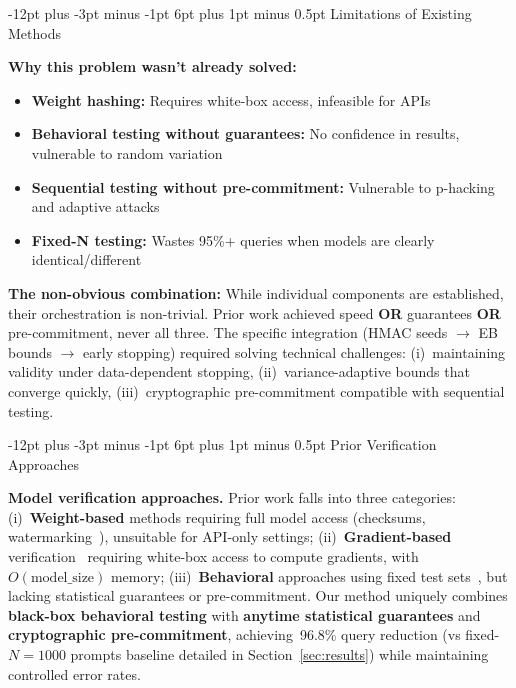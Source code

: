 \documentclass[11pt]{article}
\makeatletter
\renewcommand\subsection{\@startsection{subsection}{2}{\z@}%
  {-12pt plus -3pt minus -1pt}%
  {6pt plus 1pt minus 0.5pt}%
  {\normalfont\large\bfseries}}
\makeatother
\begin{document}
\subsection{Limitations of Existing Methods}

\textbf{Why this problem wasn't already solved:}
\begin{itemize}
\item \textbf{Weight hashing:} Requires white-box access, infeasible for APIs
\item \textbf{Behavioral testing without guarantees:} No confidence in results, vulnerable to random variation
\item \textbf{Sequential testing without pre-commitment:} Vulnerable to p-hacking and adaptive attacks
\item \textbf{Fixed-N testing:} Wastes 95\%+ queries when models are clearly identical/different
\end{itemize}

\textbf{The non-obvious combination:} While individual components are established, their orchestration is non-trivial. Prior work achieved speed \textbf{OR} guarantees \textbf{OR} pre-commitment, never all three. The specific integration (HMAC seeds $\to$ EB bounds $\to$ early stopping) required solving technical challenges: (i)~maintaining validity under data-dependent stopping, (ii)~variance-adaptive bounds that converge quickly, (iii)~cryptographic pre-commitment compatible with sequential testing.

\subsection{Prior Verification Approaches}

\textbf{Model verification approaches.} Prior work falls into three categories: (i)~\textbf{Weight-based} methods requiring full model access (checksums, watermarking~\cite{uchida2017embedding,zhang2018protecting}), unsuitable for API-only settings; (ii)~\textbf{Gradient-based} verification~\cite{jia2021proof} requiring white-box access to compute gradients, with~$O(\mathrm{model\_size})$ memory; (iii)~\textbf{Behavioral} approaches using fixed test sets~\cite{geirhos2020shortcut,hendrycks2021many}, but lacking statistical guarantees or pre-commitment. Our method uniquely combines \textbf{black-box behavioral testing} with \textbf{anytime statistical guarantees} and \textbf{cryptographic pre-commitment}, achieving~96.8\% query reduction (vs fixed-$N = 1000$ prompts baseline detailed in Section~\ref{sec:results}) while maintaining controlled error rates.
\end{document}
